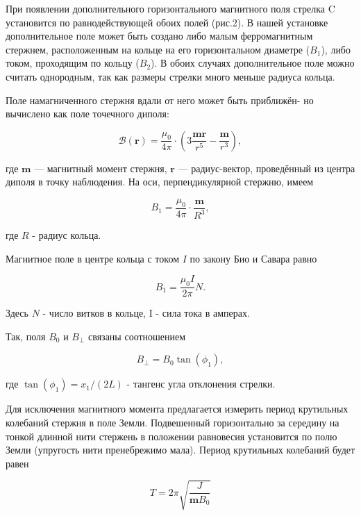 \documentclass[a4paper,12pt]{article} %
\begin{document}
При появлении дополнительного горизонтального магнитного поля  стрелка C установится по равнодействующей обоих полей (рис.2). В нашей установке дополнительное поле может быть создано
либо малым ферромагнитным стержнем, расположенным на кольце на
его горизонтальном диаметре ($B_{1}$), либо током, проходящим по кольцу
($B_{2}$). В обоих случаях дополнительное поле можно считать однородным,
так как размеры стрелки много меньше радиуса кольца.

Поле намагниченного стержня вдали от него может быть приближён-
но вычислено как поле точечного диполя:

\begin{equation}
  \mathcal{B(\mathbf{r})} = \frac{\mu_{0}}{4\pi}\cdot \left (3 \frac {\mathbf{m} \mathbf{r}}{r^5} - \frac{\mathbf{m}}{r^3} \right),
\end{equation}

где $\mathbf{m}$ — магнитный момент стержня, $\mathbf{r}$ — радиус-вектор, проведённый из центра диполя в точку наблюдения. На оси, перпендикулярной стержню, имеем

\begin{equation}
  B_{1}=\frac{\mu_{0}}{4\pi}\cdot \frac{\mathbf{m}}{R^3},
\end{equation}

где $R$ - радиус кольца.

Магнитное поле в центре кольца с током $I$ по закону Био и Савара
равно

\begin{equation}
  B_{1}=\frac{\mu_{0} I}{2\pi}N.
\end{equation}

Здесь $N$ - число витков в кольце, I - сила тока в амперах.

Так, поля $B_{0}$ и $B_{\perp}$ связаны соотношением 

\begin{equation}
  B_{\perp}=B_{0}\tan(\phi_{1}),
\end{equation}


где $\tan(\phi_{1}) = x_{1}/(2L)$ - тангенс угла отклонения стрелки.


Для исключения магнитного момента предлагается измерить период крутильных колебаний стержня в поле Земли. Подвешенный горизонтально за середину на тонкой длинной нити стержень в положении равновесия установится по полю Земли (упругость нити пренебрежимо мала). Период крутильных колебаний будет равен


\begin{equation}
  T = 2\pi\sqrt{\frac{J}{\mathbf{m}B_{0}}}
\end{equation}
\end{document}
